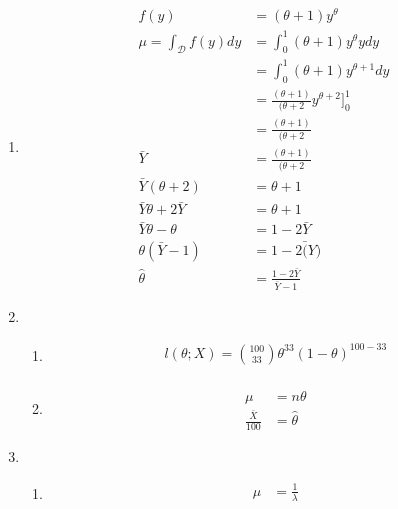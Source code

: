 \documentclass{article}
\begin{document}

\begin{enumerate}

\item 
	\begin{equation*}
	\begin{split}
f(y) & = (\theta+1)y^{\theta} \\
\mu = \int_{\mathcal{D}} f(y) dy &= \int_{0}^{1} (\theta+1)y^{\theta} y dy \\
 &= \int_{0}^{1} (\theta+1)y^{\theta+1} dy \\
&= \frac{(\theta+1)}{(\theta+2} y^{\theta +2} ]_{0}^{1} \\
&= \frac{(\theta+1)}{(\theta+2} \\
\bar{Y} &= \frac{(\theta+1)}{(\theta+2}\\
\bar{Y}(\theta +2) &= \theta+1\\
\bar{Y}\theta +2\bar{Y} &= \theta+1\\
\bar{Y}\theta - \theta &= 1 - 2\bar{Y} \\
\theta(\bar{Y} -1) & = 1 - 2\bar(Y)\\
\hat{\theta} & = \frac{1-2\bar{Y}}{\bar{Y} -1}
	\end{split}
	\end{equation*}
\item
	\begin{enumerate}
	\item
		\begin{equation*}
		\begin{split}
		l(\theta;X) = {100 \choose 33} \theta^{33}(1- \theta)^{100 -33} \\
		\end{split}
		\end{equation*}
	\item
		\begin{equation*}
		\begin{split}
		\mu &= n \theta \\
		\frac{\bar{X}}{100} &= \hat{\theta}
		\end{split}
		\end{equation*}
	\end{enumerate}
\item
	\begin{enumerate}
	\item
		\begin{equation*}
		\begin{split}
		\mu &= \frac{1}{\lambda}\\

\end{split}
\end{equation*}
\end{enumerate}
\end{enumerate}
\end{document}
